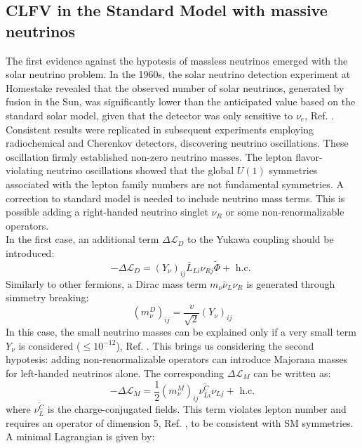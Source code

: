 \subsection{CLFV in the Standard Model with massive neutrinos}\label{massiveneutrinos}
The first evidence against the hypotesis of massless neutrinos emerged with the solar neutrino problem. In the 1960s, the solar neutrino detection experiment at Homestake revealed that the observed number of solar neutrinos, generated by fusion in the Sun, was significantly lower than the anticipated value based on the standard solar model, given that the detector was only sensitive to $\nu_e$, Ref. \cite{PhysRevLett.20.1205}. Consistent results were replicated in subsequent experiments employing radiochemical and Cherenkov detectors, discovering neutrino oscillations. These oscillation firmly established non-zero neutrino masses. The lepton flavor-violating neutrino oscillations showed that the global $U(1)$ symmetries associated with the lepton family numbers are not fundamental symmetries. A correction to standard model is needed to include neutrino mass terms. This is possible adding a right-handed neutrino singlet $\nu_R$ or some non-renormalizable operators.
\\
In the first case, an additional term $\Delta \mathscr{L}_D$ to the Yukawa coupling should be introduced:
\begin{equation}
-\Delta \mathscr{L}_D=\left(Y_\nu\right)_{i j} \bar{L}_{L i} \nu_{Rj} \widetilde{\Phi}+\text { h.c. }
\end{equation}
Similarly to other fermions, a Dirac mass term $m_{\nu} \bar{\nu}_L \nu_R$ is generated through simmetry breaking:
\begin{equation}
\left(m_\nu^D\right)_{i j}=\frac{v}{\sqrt{2}}\left(Y_\nu\right)_{i j}
\end{equation}
In this case, the small neutrino masses can be explained only if a very small term $Y_\nu$ is considered ($\leq 10^{-12}$), Ref. \cite{clfv_signorelli}. This brings us considering the second hypotesis: adding non-renormalizable operators can introduce Majorana masses for left-handed neutrinos alone. The corresponding $\Delta \mathscr{L}_M$ can be written as:
\begin{equation}
-\Delta \mathscr{L}_M=\frac{1}{2}\left(m_\nu^M\right)_{i j} \overline{\nu_{L i}^C} \nu_{L j}+\text{ h.c.}
\end{equation}
where $\overline{\nu_{L }^C} $ is the charge-conjugated fields. This term violates lepton number and requires an operator of dimension 5, Ref. \cite{wein}, to be consistent with SM symmetries. A minimal Lagrangian is given by:
